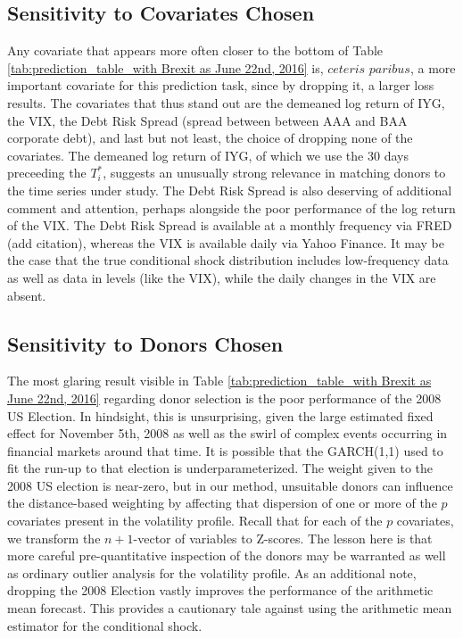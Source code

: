 \documentclass[11pt,3p,review,authoryear]{elsarticle}
\theoremstyle{definition}
\begin{document}
\subsection{Sensitivity to Covariates Chosen}
Any covariate that appears more often closer to the bottom of Table \ref{tab:prediction_table_with Brexit as June 22nd, 2016} is, $\textit{ceteris paribus}$, a more important covariate for this prediction task, since by dropping it, a larger loss results.  The covariates that thus stand out are the demeaned log return of IYG, the VIX, the Debt Risk Spread (spread between between AAA and BAA corporate debt), and last but not least, the choice of dropping none of the covariates.  The demeaned log return of IYG, of which we use the 30 days preceeding the $T_{i}^{*}$, suggests an unusually strong relevance in matching donors to the time series under study.  The Debt Risk Spread is also deserving of additional comment and attention, perhaps alongside the poor performance of the log return of the VIX.  The Debt Risk Spread is available at a monthly frequency via FRED (add citation), whereas the VIX is available daily via Yahoo Finance.  It may be the case that the true conditional shock distribution includes low-frequency data as well as data in levels (like the VIX), while the daily changes in the VIX are absent.


\subsection{Sensitivity to Donors Chosen}

The most glaring result visible in Table \ref{tab:prediction_table_with Brexit as June 22nd, 2016} regarding donor selection is the poor performance of the 2008 US Election.  In hindsight, this is unsurprising, given the large estimated fixed effect for November 5th, 2008 as well as the swirl of complex events occurring in financial markets around that time.  It is possible that the GARCH(1,1) used to fit the run-up to that election is underparameterized.  The weight given to the 2008 US election is near-zero, but in our method, unsuitable donors can influence the distance-based weighting by affecting that dispersion of one or more of the $p$ covariates present in the volatility profile.  Recall that for each of the $p$ covariates, we transform the $n+1$-vector of variables to Z-scores.  The lesson here is that more careful pre-quantitative inspection of the donors may be warranted as well as ordinary outlier analysis for the volatility profile.  As an additional note, dropping the 2008 Election vastly improves the performance of the arithmetic mean forecast.  This provides a cautionary tale against using the arithmetic mean estimator for the conditional shock.  
\end{document}
